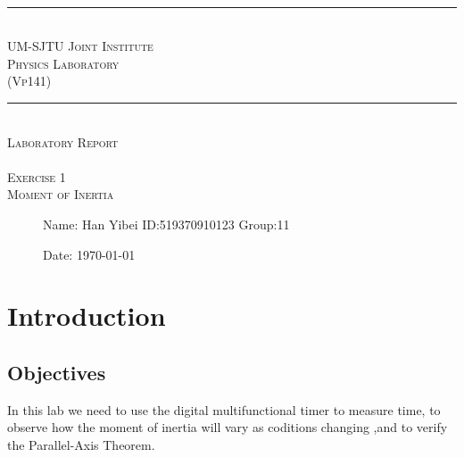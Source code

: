 \documentclass[12pt,a4paper]{article}
\begin{document}
\begin{center}
~\\
\rule[0mm]{400pt}{0.5pt}
\Large{ \textsc{\newline\\UM-SJTU Joint Institute\\Physics Laboratory\\(Vp141)\\}}
\rule[0mm]{400pt}{0.5pt}
\Large{ \textsc{\newline\newline\newline\newline\newline\newline\\
Laboratory Report\\}}
\Large{\textsc{ \\ Exercise 1  \\ Moment of Inertia} }

\end{center}

\begin{description}
    \item[] 
    \item[] 
    \item[] 
    \item[] 
    \item[] 
    \item[]
    \item[]\qquad \qquad Name: Han Yibei \qquad ID:519370910123   \qquad    Group:11\\
    \item[]\qquad \qquad Date: \today
\end{description}

\newpage



\section{Introduction}

\subsection{Objectives}
    In this lab we need to use the digital multifunctional timer to measure time, 
    to observe how the moment of inertia will vary as coditions changing ,and to verify the Parallel-Axis Theorem.
\end{document}
